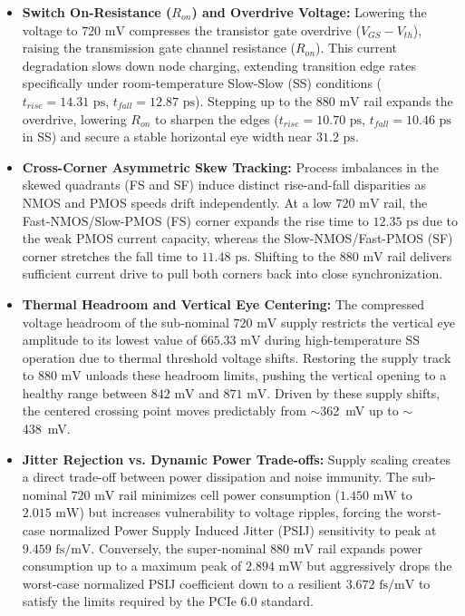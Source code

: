 \begin{itemize}
    \item \textbf{Switch On-Resistance ($R_{on}$) and Overdrive Voltage:} Lowering the voltage to $720\text{ mV}$ compresses the transistor gate overdrive ($V_{GS} - V_{th}$), raising the transmission gate channel resistance ($R_{on}$). This current degradation slows down node charging, extending transition edge rates specifically under room-temperature Slow-Slow (SS) conditions ($t_{rise} = 14.31\text{ ps}$, $t_{fall} = 12.87\text{ ps}$). Stepping up to the $880\text{ mV}$ rail expands the overdrive, lowering $R_{on}$ to sharpen the edges ($t_{rise} = 10.70\text{ ps}$, $t_{fall} = 10.46\text{ ps}$ in SS) and secure a stable horizontal eye width near $31.2\text{ ps}$.
    
    \item \textbf{Cross-Corner Asymmetric Skew Tracking:} Process imbalances in the skewed quadrants (FS and SF) induce distinct rise-and-fall disparities as NMOS and PMOS speeds drift independently. At a low $720\text{ mV}$ rail, the Fast-NMOS/Slow-PMOS (FS) corner expands the rise time to $12.35\text{ ps}$ due to the weak PMOS current capacity, whereas the Slow-NMOS/Fast-PMOS (SF) corner stretches the fall time to $11.48\text{ ps}$. Shifting to the $880\text{ mV}$ rail delivers sufficient current drive to pull both corners back into close synchronization.
    
    \item \textbf{Thermal Headroom and Vertical Eye Centering:} The compressed voltage headroom of the sub-nominal $720\text{ mV}$ supply restricts the vertical eye amplitude to its lowest value of $665.33\text{ mV}$ during high-temperature SS operation due to thermal threshold voltage shifts. Restoring the supply track to $880\text{ mV}$ unloads these headroom limits, pushing the vertical opening to a healthy range between $842\text{ mV}$ and $871\text{ mV}$. Driven by these supply shifts, the centered crossing point moves predictably from $\sim$362~mV up to $\sim$438~mV.
    
    \item \textbf{Jitter Rejection vs. Dynamic Power Trade-offs:} Supply scaling creates a direct trade-off between power dissipation and noise immunity. The sub-nominal $720\text{ mV}$ rail minimizes cell power consumption ($1.450\text{ mW}$ to $2.015\text{ mW}$) but increases vulnerability to voltage ripples, forcing the worst-case normalized Power Supply Induced Jitter (PSIJ) sensitivity to peak at $9.459\text{ fs/mV}$. Conversely, the super-nominal $880\text{ mV}$ rail expands power consumption up to a maximum peak of $2.894\text{ mW}$ but aggressively drops the worst-case normalized PSIJ coefficient down to a resilient $3.672\text{ fs/mV}$ to satisfy the  limits required by the PCIe 6.0 standard.
\end{itemize}

